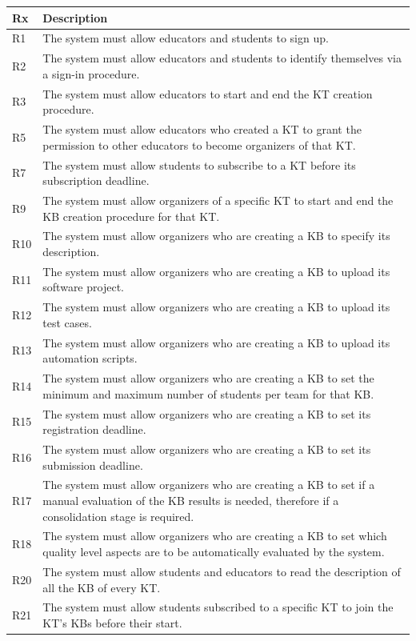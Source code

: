\documentclass[11pt]{report}
\begin{document}
\begin{longtable}[h] {|p{10mm} p{130mm}|}
\hline
\textbf{Rx} & \textbf{Description} \\ \hline
R1 & The system must allow educators and students to sign up. \\ 
R2 & The system must allow educators and students to identify themselves via a sign-in procedure. \\ 
R3 & The system must allow educators to start and end the KT creation procedure.\\
R5 & The system must allow educators who created a KT to grant the permission to other educators to become organizers of that KT. \\ 
R7 & The system must allow students to subscribe to a KT before its subscription deadline. \\ 
R9 & The system must allow organizers of a specific KT to start and end the KB creation procedure for that KT\@. \\
R10 & The system must allow organizers who are creating a KB to specify its description. \\ 
R11 & The system must allow organizers who are creating a KB to upload its software project. \\ 
R12 & The system must allow organizers who are creating a KB to upload its test cases. \\ 
R13 & The system must allow organizers who are creating a KB to upload its automation scripts. \\ 
R14 & The system must allow organizers who are creating a KB to set the minimum and maximum number of students per team for that KB. \\ 
R15 & The system must allow organizers who are creating a KB to set its registration deadline. \\ 
R16 & The system must allow organizers who are creating a KB to set its submission deadline. \\ 
R17 & The system must allow organizers who are creating a KB to set if a manual evaluation of the KB results is needed, therefore if a consolidation stage is required. \\ 
R18 & The system must allow organizers who are creating a KB to set which quality level aspects are to be automatically evaluated by the system. \\ 
R20 & The system must allow students and educators to read the description of all the KB of every KT. \\ 
R21 & The system must allow students subscribed to a specific KT to join the KT’s KBs before their start. \\ 

\end{longtable}
\end{document}

